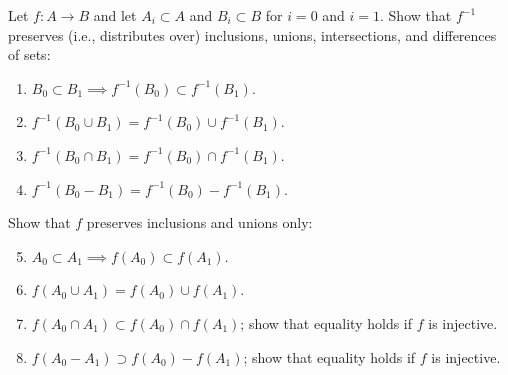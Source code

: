 \documentclass[12pt]{article}
\newenvironment{problem}[2][Exercise]{\begin{trivlist}
\item[\hskip \labelsep {\bfseries #1}\hskip \labelsep {\bfseries #2.}]}{\end{trivlist}}
\begin{document}
\begin{problem}{1.2.2}
Let $f:A\rightarrow B$ and let $A_i \subset A$ and $B_i \subset B$ for $i=0$ and $i=1$. Show that $f^{-1}$ preserves {\color{red}(i.e., distributes over)} inclusions, unions, intersections, and differences of sets:
\begin{enumerate}[label=(\alph*)]
	\item $B_0 \subset B_1 \implies f^{-1}\left( B_0 \right) \subset f^{-1} \left(B_1\right)$.
	\item $f^{-1}\left(B_0 \cup B_1\right) = f^{-1}\left(B_0\right)\cup f^{-1}\left(B_1\right)$.
	\item $f^{-1}\left(B_0\cap B_1\right) = f^{-1}\left(B_0\right) \cap f^{-1}\left(B_1\right)$.
	\item $f^{-1}\left(B_0-B_1\right) = f^{-1}\left(B_0\right) - f^{-1}\left(B_1\right)$.
\end{enumerate}
Show that $f$ preserves inclusions and unions only:
\begin{enumerate}[label=(\alph*)]
	\setcounter{enumi}{4}
	\item $A_0 \subset A_1 \implies f\left(A_0\right) \subset f\left(A_1\right)$.
	\item $f\left(A_0 \cup A_1\right) = f\left(A_0\right) \cup f\left(A_1\right)$.
	\item $f\left(A_0 \cap A_1\right) \subset f\left(A_0\right)\cap f\left(A_1\right)$; show that equality holds if $f$ is injective.
	\item $f\left(A_0 - A_1\right) \supset f\left(A_0\right)-f\left(A_1\right)$; show that equality holds if $f$ is injective.
\end{enumerate}
\end{problem}
\end{document}
